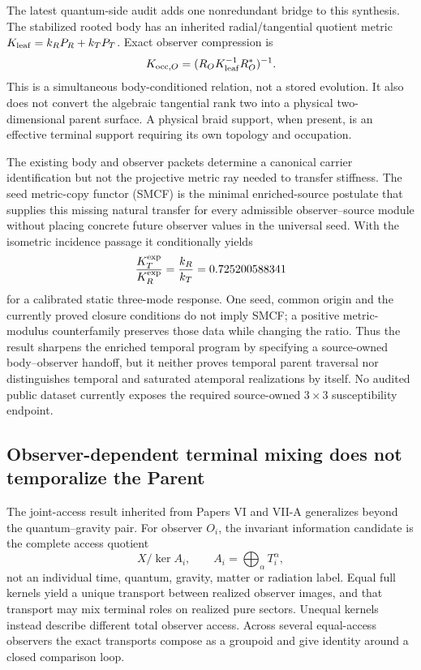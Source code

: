 \documentclass[11pt]{article}
\begin{document}
The latest quantum-side audit adds one nonredundant bridge to this synthesis.
The stabilized rooted body has an inherited radial/tangential quotient metric
$K_{\rm leaf}=k_RP_R+k_TP_T$.  Exact observer compression is
\begin{equation}
 K_{{\rm occ},O}=(R_OK_{\rm leaf}^{-1}R_O^*)^{-1}.
 \label{eq:synthesis-observer-compression}
\end{equation}
This is a simultaneous body-conditioned relation, not a stored evolution.
It also does not convert the algebraic tangential rank two into a physical
two-dimensional parent surface.  A physical braid support, when present, is
an effective terminal support requiring its own topology and occupation.

The existing body and observer packets determine a canonical carrier
identification but not the projective metric ray needed to transfer stiffness.
The seed metric-copy functor (SMCF) is the minimal enriched-source postulate
that supplies this missing natural transfer for every admissible
observer--source module without placing concrete future observer values in the
universal seed.  With the isometric incidence passage it conditionally yields
\begin{equation}
 \frac{K_T^{\rm exp}}{K_R^{\rm exp}}
 =\frac{k_R}{k_T}=0.725200588341
 \label{eq:synthesis-smcf-ratio}
\end{equation}
for a calibrated static three-mode response.  One seed, common origin and the
currently proved closure conditions do not imply SMCF; a positive
metric-modulus counterfamily preserves those data while changing the ratio.
Thus the result sharpens the enriched temporal program by specifying a
source-owned body--observer handoff, but it neither proves temporal parent
traversal nor distinguishes temporal and saturated atemporal realizations by
itself.  No audited public dataset currently exposes the required source-owned
$3\times3$ susceptibility endpoint.

\subsection{Observer-dependent terminal mixing does not temporalize the Parent}

The joint-access result inherited from Papers VI and VII-A generalizes beyond
the quantum--gravity pair. For observer $O_i$, the invariant information
candidate is the complete access quotient
\begin{equation}
 X/\ker A_i,
 \qquad A_i=\bigoplus_{\alpha}T_i^\alpha,
 \label{eq:synthesis-joint-access}
\end{equation}
not an individual time, quantum, gravity, matter or radiation label. Equal
full kernels yield a unique transport between realized observer images, and
that transport may mix terminal roles on realized pure sectors. Unequal
kernels instead describe different total observer access. Across several
equal-access observers the exact transports compose as a groupoid and give
identity around a closed comparison loop.
\end{document}
